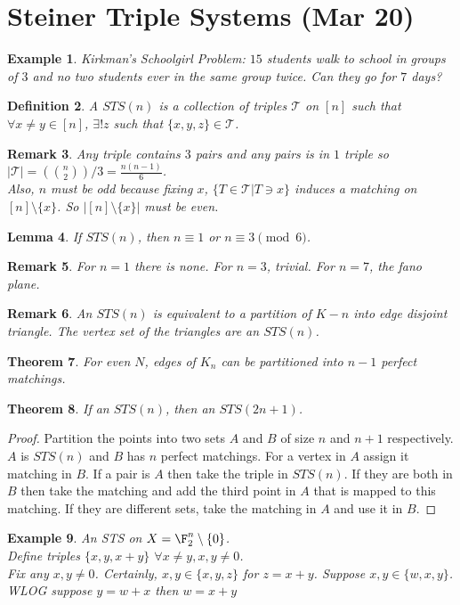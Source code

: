 \documentclass[a4paper]{article}
\newtheorem{thm}{Theorem}[section]
\newtheorem{lem}[thm]{Lemma}
\newtheorem{defn}[thm]{Definition}
\newtheorem{eg}[thm]{Example}
\newtheorem{rmk}[thm]{Remark}
\begin{document}
\section{Steiner Triple Systems (Mar 20)}
\begin{eg}
    Kirkman's Schoolgirl Problem: $15$ students walk to school in groups of $3$ and no two students ever in the same group twice. Can they go for $7$ days?
\end{eg}
\begin{defn}
    A $STS(n)$ is a collection of triples $\mathcal{T}$ on $[n]$ such that $\forall x\neq y\in [n]$, $\exists ! z$ such that $ \{x,y,z\}\in \mathcal{T}$. 
\end{defn}
\begin{rmk}
    Any triple contains $3$ pairs and any pairs is in $1$ triple so $|\mathcal{T}|= (\binom{n}{2})/3=\frac{n(n-1)}{6}$.\\
    Also, $n$ must be odd because fixing $x$, $ \{T\in \mathcal{T}|T\ni x\} $ induces a matching on $[n]\setminus \{x\}$. So $|[n]\setminus \{x\}|$ must be even.
\end{rmk}
\begin{lem}
    If $STS(n)$, then $n\equiv 1 $ or $n\equiv 3 \pmod 6$. 
\end{lem}
\begin{rmk}
    For $n=1$ there is none. For $n=3$, trivial. For $n=7$, the fano plane. 
\end{rmk}
\begin{rmk}
    An $STS(n)$ is equivalent to a partition of $K-n$ into edge disjoint triangle. The vertex set of the triangles are an $STS(n)$. 
\end{rmk}
\begin{thm}
    For even $N$, edges of $K_n$ can be partitioned into $n-1$ perfect matchings. 
\end{thm}
\begin{thm}
    If an $STS(n)$, then an $STS(2n+1)$. 
\end{thm}
\begin{proof}
    Partition the points into two sets $A$ and $B$ of size $n$ and $n+1$ respectively. $A$ is $STS(n)$ and $B$ has $n$ perfect matchings. For a vertex in $A$ assign it matching in $B$. If a pair is $A$ then take the triple in $STS(n)$. If they are both in $B$ then take the matching and add the third point in $A$ that is mapped to this matching. If they are different sets, take the matching in $A$ and use it in $B$. 
\end{proof}
\begin{eg}
    An STS on $X=\F_2^n \setminus \{0\}$. \\
    Define triples $ \{x,y,x+y\}$ $\forall x\neq y, x,y\neq 0$. \\
    Fix any $x,y\neq 0$. Certainly, $x,y\in \{x,y,z\}$ for $z=x+y$. Suppose $x,y\in \{w,x,y\}$. WLOG suppose $y=w+x$ then $w=x+y$
\end{eg}
\end{document}
